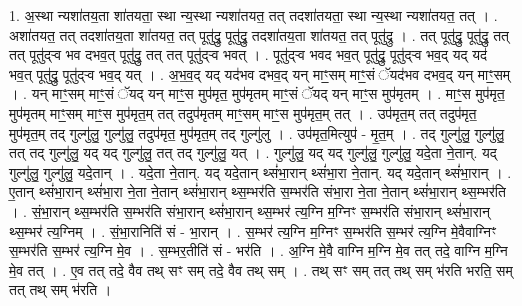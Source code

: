 \documentclass[17pt]{extarticle}
\begin{document}
1. अ॒स्था न्यशा॑तय॒ता शा॑तयता॒ स्था न्य॒स्था न्यशा॑तयत॒ तत् तदशा॑तयता॒ स्था न्य॒स्था न्यशा॑तयत॒ तत् । . अशा॑तयत॒ तत् तदशा॑तय॒ता शा॑तयत॒ तत् पूतु॑द्रु॒ पूतु॑द्रु॒ तदशा॑तय॒ता शा॑तयत॒ तत् पूतु॑द्रु । . तत् पूतु॑द्रु॒ पूतु॑द्रु॒ तत् तत् पूतु॑द्र्‍व भव दभव॒त् पूतु॑द्रु॒ तत् तत् पूतु॑द्र्‍व भवत् । . पूतु॑द्र्‍व भवद भव॒त् पूतु॑द्रु॒ पूतु॑द्र्‍व भव॒द् यद् यद॑ भव॒त् पूतु॑द्रु॒ पूतु॑द्र्‍व भव॒द् यत् । . अ॒भ॒व॒द् यद् यद॑भव दभव॒द् यन् माꣳ॒॒सम् माꣳ॒॒सं ॅयद॑भव दभव॒द् यन् माꣳ॒॒सम् । . यन् माꣳ॒॒सम् माꣳ॒॒सं ॅयद् यन् माꣳ॒॒स मुप॑मृत॒ मुप॑मृतम् माꣳ॒॒सं ॅयद् यन् माꣳ॒॒स मुप॑मृतम् । . माꣳ॒॒स मुप॑मृत॒ मुप॑मृतम् माꣳ॒॒सम् माꣳ॒॒स मुप॑मृत॒म् तत् तदुप॑मृतम् माꣳ॒॒सम् माꣳ॒॒स मुप॑मृत॒म् तत् । . उप॑मृत॒म् तत् तदुप॑मृत॒ मुप॑मृत॒म् तद् गुल्गु॑लु॒ गुल्गु॑लु॒ तदुप॑मृत॒ मुप॑मृत॒म् तद् गुल्गु॑लु । . उप॑मृत॒मित्युप॑ - मृ॒त॒म् । . तद् गुल्गु॑लु॒ गुल्गु॑लु॒ तत् तद् गुल्गु॑लु॒ यद् यद् गुल्गु॑लु॒ तत् तद् गुल्गु॑लु॒ यत् । . गुल्गु॑लु॒ यद् यद् गुल्गु॑लु॒ गुल्गु॑लु॒ यदे॒ता ने॒तान्. यद् गुल्गु॑लु॒ गुल्गु॑लु॒ यदे॒तान् । . यदे॒ता ने॒तान्. यद् यदे॒तान् थ्सं॑भा॒रान् थ्सं॑भा॒रा ने॒तान्. यद् यदे॒तान् थ्सं॑भा॒रान् । . ए॒तान् थ्सं॑भा॒रान् थ्सं॑भा॒रा ने॒ता ने॒तान् थ्सं॑भा॒रान् थ्स॒म्भर॑ति स॒म्भर॑ति संभा॒रा ने॒ता ने॒तान् थ्सं॑भा॒रान् थ्स॒म्भर॑ति । . सं॒भा॒रान् थ्स॒म्भर॑ति स॒म्भर॑ति संभा॒रान् थ्सं॑भा॒रान् थ्स॒म्भर॑ त्य॒ग्नि म॒ग्निꣳ स॒म्भर॑ति संभा॒रान् थ्सं॑भा॒रान् थ्स॒म्भर॑ त्य॒ग्निम् । . सं॒भा॒रानिति॑ सं - भा॒रान् । . स॒म्भर॑ त्य॒ग्नि म॒ग्निꣳ स॒म्भर॑ति स॒म्भर॑ त्य॒ग्नि मे॒वैवाग्निꣳ स॒म्भर॑ति स॒म्भर॑ त्य॒ग्नि मे॒व । . स॒म्भर॒तीति॑ सं - भर॑ति । . अ॒ग्नि मे॒वै वाग्नि म॒ग्नि मे॒व तत् तदे॒ वाग्नि म॒ग्नि मे॒व तत् । . ए॒व तत् तदे॒ वैव तथ् सꣳ सम् तदे॒ वैव तथ् सम् । . तथ् सꣳ सम् तत् तथ् सम् भ॑रति भरति॒ सम् तत् तथ् सम् भ॑रति । \newline
\end{document}
